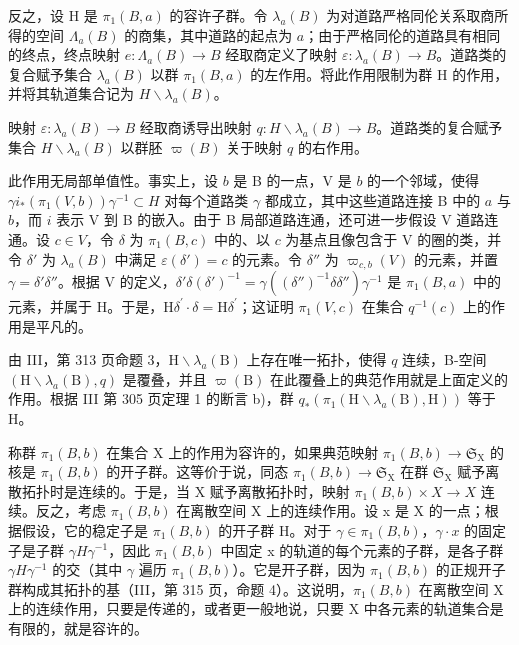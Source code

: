 反之，设 H 是 \(\pi_1(B, a)\) 的容许子群。令 \(\lambda_a(B)\) 为对道路严格同伦关系取商所得的空间 \(\Lambda_a(B)\) 的商集，其中道路的起点为 \(a\)；由于严格同伦的道路具有相同的终点，终点映射 \(e: \Lambda_a(B) \to B\) 经取商定义了映射 \(\varepsilon: \lambda_a(B) \to B\)。道路类的复合赋予集合 \(\lambda_a(B)\) 以群 \(\pi_1(B, a)\) 的左作用。将此作用限制为群 H 的作用，并将其轨道集合记为 \(H\backslash\lambda_a(B)\)。

映射 \(\varepsilon\colon\lambda_{a}(B)\to B\) 经取商诱导出映射 \(q\colon H\backslash\lambda_{a}(B)\to B\)。道路类的复合赋予集合 \(H\backslash\lambda_a(B)\) 以群胚 \(\varpi(B)\) 关于映射 \(q\) 的右作用。

此作用无局部单值性。事实上，设 \(b\) 是 B 的一点，V 是 \(b\) 的一个邻域，使得 \(\gamma i_{*}(\pi_{1}(V,b))\gamma^{-1}\subset H\) 对每个道路类 \(\gamma\) 都成立，其中这些道路连接 B 中的 \(a\) 与 \(b\)，而 \(i\) 表示 V 到 B 的嵌入。由于 B 局部道路连通，还可进一步假设 V 道路连通。设 \(c\in V\)，令 \(\delta\) 为 \(\pi_1(B,c)\) 中的、以 \(c\) 为基点且像包含于 V 的圈的类，并令 \(\delta'\) 为 \(\lambda_a(B)\) 中满足 \(\varepsilon (\delta ') = c\) 的元素。令 \(\delta''\) 为 \(\varpi_{c,b}(V)\) 的元素，并置 \(\gamma = \delta '\delta ''\)。根据 V 的定义，\(\delta '\delta (\delta ')^{-1} = \gamma ((\delta '')^{-1}\delta \delta '')\gamma^{-1}\) 是 \(\pi_1(B,a)\) 中的元素，并属于 H。于是，\(\mathrm{H}\delta^{\prime}\cdot \delta = \mathrm{H}\delta^{\prime}\)；这证明 \(\pi_1(V,c)\) 在集合 \(q^{-1}(c)\) 上的作用是平凡的。

由 III，第 313 页命题 3，\(\mathrm{H}\backslash\lambda_{a}(\mathrm{B})\) 上存在唯一拓扑，使得 \(q\) 连续，B-空间 \((\mathrm{H}\backslash\lambda_{a}(\mathrm{B}),q)\) 是覆叠，并且 \(\varpi(\mathrm{B})\) 在此覆叠上的典范作用就是上面定义的作用。根据 III 第 305 页定理 1 的断言 b)，群 \(q_{*}(\pi_{1}(\mathrm{H}\backslash\lambda_{a}(\mathrm{B}),\mathrm{H}))\) 等于 H。

称群 \(\pi_1(B, b)\) 在集合 X 上的作用为容许的，如果典范映射 \(\pi_1(B, b) \to \mathfrak{S}_{\mathrm{X}}\) 的核是 \(\pi_1(B, b)\) 的开子群。这等价于说，同态 \(\pi_1(B, b) \to \mathfrak{S}_{\mathrm{X}}\) 在群 \(\mathfrak{S}_{\mathrm{X}}\) 赋予离散拓扑时是连续的。于是，当 X 赋予离散拓扑时，映射 \(\pi_1(B, b) \times X \to X\) 连续。反之，考虑 \(\pi_{1}(B,b)\) 在离散空间 X 上的连续作用。设 x 是 X 的一点；根据假设，它的稳定子是 \(\pi_{1}(B,b)\) 的开子群 H。对于 \(\gamma\in\pi_{1}(B,b)\)，\(\gamma\cdot x\) 的固定子是子群 \(\gamma H\gamma^{-1}\)，因此 \(\pi_{1}(B,b)\) 中固定 x 的轨道的每个元素的子群，是各子群 \(\gamma H\gamma^{-1}\) 的交（其中 \(\gamma\) 遍历 \(\pi_{1}(B,b)\)）。它是开子群，因为 \(\pi_{1}(B,b)\) 的正规开子群构成其拓扑的基（III，第 315 页，命题 4）。这说明，\(\pi_{1}(B,b)\) 在离散空间 X 上的连续作用，只要是传递的，或者更一般地说，只要 X 中各元素的轨道集合是有限的，就是容许的。

